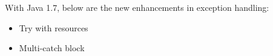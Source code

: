 \setlength{\columnsep}{3pt}
\begin{flushleft}
	
	With Java 1.7, below are the new enhancements in exception handling:
	\begin{itemize}
		\item Try with resources
		\item Multi-catch block 
	\end{itemize}
	
\end{flushleft}






